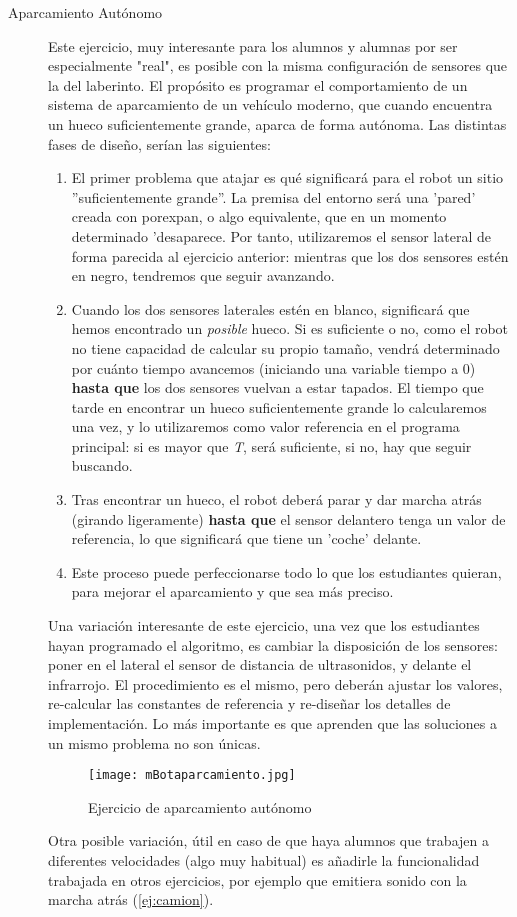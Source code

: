 \begin{description}
	
	\item [Aparcamiento Autónomo] \label{ej:aparcamiento}
	Este ejercicio, muy interesante para los alumnos y alumnas por ser especialmente "real", es posible con la misma configuración de sensores que la del laberinto. El propósito es programar el comportamiento de un sistema de aparcamiento de un vehículo moderno, que cuando encuentra un hueco suficientemente grande, aparca de forma autónoma. Las distintas fases de diseño, serían las siguientes:
	\begin{enumerate}
		\item El primer problema que atajar es qué significará para el robot un sitio ''suficientemente grande''. La premisa del entorno será una 'pared' creada con porexpan, o algo equivalente, que en un momento determinado 'desaparece. Por tanto, utilizaremos el sensor lateral de forma parecida al ejercicio anterior: mientras que los dos sensores estén en negro, tendremos que seguir avanzando.
		\item Cuando los dos sensores laterales estén en blanco, significará que hemos encontrado un \textit{posible} hueco. Si es suficiente o no, como el robot no tiene capacidad de calcular su propio tamaño, vendrá determinado por cuánto tiempo avancemos (iniciando una variable tiempo a 0) \textbf{hasta que} los dos sensores vuelvan a estar tapados. El tiempo que tarde en encontrar un hueco suficientemente grande lo calcularemos una vez, y lo utilizaremos como valor referencia en el programa principal: si es mayor que \textit{T}, será suficiente, si no, hay que seguir buscando.
		\item Tras encontrar un hueco, el robot deberá parar y dar marcha atrás (girando ligeramente) \textbf{hasta que} el sensor delantero tenga un valor de referencia, lo que significará que tiene un 'coche' delante. 
		\item Este proceso puede perfeccionarse todo lo que los estudiantes quieran, para mejorar el aparcamiento y que sea más preciso.		
	\end{enumerate}
	Una variación interesante de este ejercicio, una vez que los estudiantes hayan programado el algoritmo, es cambiar la disposición de los sensores: poner en el lateral el sensor de distancia de ultrasonidos, y delante el infrarrojo. El procedimiento es el mismo, pero deberán ajustar los valores, re-calcular las constantes de referencia y re-diseñar los detalles de implementación. Lo más importante es que aprenden que las soluciones a un mismo problema no son únicas.
	\begin{figure}[H]
		\texttt{[image: mBotaparcamiento.jpg]}
		\centering
		\label{img:mBotaparcamiento}
		\caption{Ejercicio de aparcamiento autónomo}
	\end{figure}
	Otra posible variación, útil en caso de que haya alumnos que trabajen a diferentes velocidades (algo muy habitual) es añadirle la funcionalidad trabajada en otros ejercicios, por ejemplo que emitiera sonido con la marcha atrás (\ref{ej:camion}).
\end{description}


